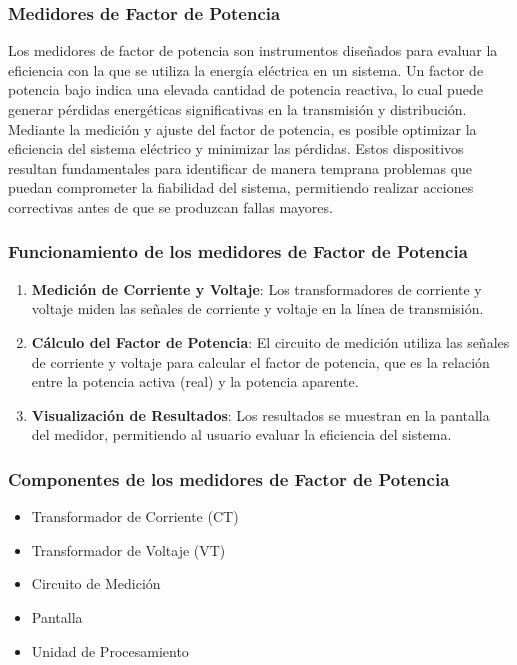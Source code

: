         \subsubsection{Medidores de Factor de Potencia}

            Los medidores de factor de potencia son instrumentos diseñados para evaluar la eficiencia con la que se utiliza la energía eléctrica en un sistema. Un factor de potencia bajo indica una elevada cantidad de potencia reactiva, lo cual puede generar pérdidas energéticas significativas en la transmisión y distribución. Mediante la medición y ajuste del factor de potencia, es posible optimizar la eficiencia del sistema eléctrico y minimizar las pérdidas. Estos dispositivos resultan fundamentales para identificar de manera temprana problemas que puedan comprometer la fiabilidad del sistema, permitiendo realizar acciones correctivas antes de que se produzcan fallas mayores.

        \subsubsection*{Funcionamiento de los medidores de Factor de Potencia}

            \begin{enumerate}
                \item \textbf{Medición de Corriente y Voltaje}: Los transformadores de corriente y voltaje miden las señales de corriente y voltaje en la línea de transmisión.
                \item \textbf{Cálculo del Factor de Potencia}: El circuito de medición utiliza las señales de corriente y voltaje para calcular el factor de potencia, que es la relación entre la potencia activa (real) y la potencia aparente.
                \item \textbf{Visualización de Resultados}: Los resultados se muestran en la pantalla del medidor, permitiendo al usuario evaluar la eficiencia del sistema.
            \end{enumerate}

        \subsubsection*{Componentes de los medidores de Factor de Potencia}

            \begin{itemize}
              \item Transformador de Corriente (CT)
              \item Transformador de Voltaje (VT)
              \item Circuito de Medición
              \item Pantalla
              \item Unidad de Procesamiento
            \end{itemize}

